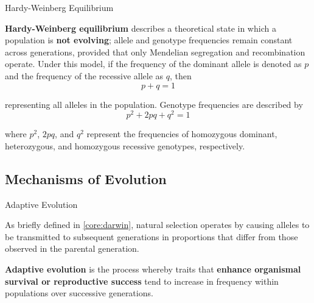 \documentclass[10pt]{article}
\begin{document}
    \begin{core}{Hardy-Weinberg Equilibrium}

      \textbf{Hardy-Weinberg equilibrium} describes a theoretical state in which a population is \textbf{not evolving}; allele and genotype frequencies remain constant across generations, provided that only Mendelian segregation and recombination operate. Under this model, if the frequency of the dominant allele is denoted as $p$ and the frequency of the recessive allele as $q$, then
      \[
        p + q = 1
      \]

      representing all alleles in the population. Genotype frequencies are described by
      \[
        p^2 + 2pq + q^2 = 1
      \]

      where $p^2$, $2pq$, and $q^2$ represent the frequencies of homozygous dominant, heterozygous, and homozygous recessive genotypes, respectively.

    \end{core}

  \subsection{Mechanisms of Evolution}

    \begin{core}{Adaptive Evolution}

      As briefly defined in \autoref{core:darwin}, natural selection operates by causing alleles to be transmitted to subsequent generations in proportions that differ from those observed in the parental generation.

      \textbf{Adaptive evolution} is the process whereby traits that \textbf{enhance organismal survival or reproductive success} tend to increase in frequency within populations over successive generations.

    \end{core}
\end{document}
